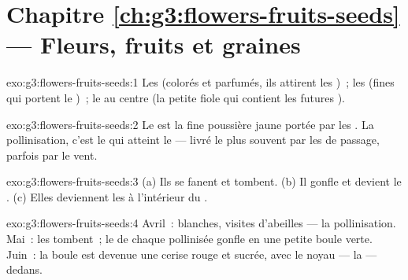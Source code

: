 \section*{Chapitre \ref{ch:g3:flowers-fruits-seeds} --- Fleurs, fruits et graines}

\begin{solution}{exo:g3:flowers-fruits-seeds:1}
Les  (colorés et parfumés, ils attirent les )~; les
 (fines  qui portent le )~; le  au centre
(la petite fiole qui contient les futures ).
\end{solution}

\begin{solution}{exo:g3:flowers-fruits-seeds:2}
Le  est la fine poussière jaune portée par les . La
pollinisation, c'est le  qui atteint le  --- livré le
plus souvent par les  de passage, parfois par le vent.
\end{solution}

\begin{solution}{exo:g3:flowers-fruits-seeds:3}
(a) Ils se fanent et tombent. (b) Il gonfle et devient le .
(c) Elles deviennent les  à l'intérieur du .
\end{solution}

\begin{solution}{exo:g3:flowers-fruits-seeds:4}
Avril~:  blanches, visites d'abeilles --- la pollinisation.
Mai~: les  tombent~; le  de chaque  pollinisée
gonfle en une petite boule verte. Juin~: la boule est devenue une
cerise rouge et sucrée, avec le noyau --- la  --- dedans.
\end{solution}

